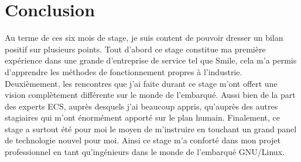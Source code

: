 \chapter{Conclusion}
Au terme de ces six mois de stage, je suis content de pouvoir dresser un bilan positif sur plusieurs points. Tout d'abord ce stage constitue ma première expérience dans une grande  d'entreprise de service tel que Smile, cela m'a permis d'apprendre les méthodes de fonctionnement propres à l'industrie. Deuxièmement, les rencontres que j'ai faite durant ce stage m'ont offert une vision complètement différente sur le monde de l'embarqué. Aussi bien de la part des experts ECS, auprès desquels j'ai beaucoup appris, qu'auprès des autres stagiaires qui m'ont énormément apporté sur le plan humain. Finalement, ce stage a surtout été pour moi le moyen de m'instruire en touchant un grand panel de technologie nouvel pour moi.
Ainsi ce stage m'a conforté dans mon projet professionnel en tant qu'ingénieurs dans le monde de l'embarqué GNU/Linux.